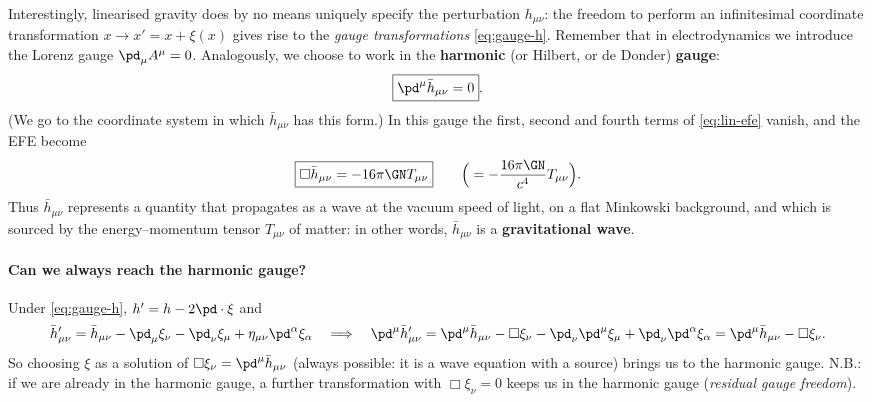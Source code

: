 Interestingly, linearised gravity does by no means uniquely specify the perturbation $h_{\mu\nu}$: the freedom to perform an infinitesimal coordinate transformation $x\to x'=x+\xi(x)$ gives rise to the \emph{gauge transformations} \eqref{eq:gauge-h}. Remember that in electrodynamics we introduce the Lorenz gauge $\pd_\mu A^\mu=0$. Analogously, we choose to work in the \textbf{harmonic} (or Hilbert, or de Donder) \textbf{gauge}:
\begin{equation}
  \boxed{\pd^\mu\bar h_{\mu\nu}=0}.
\end{equation}
(We go to the coordinate system in which $\bar h_{\mu\nu}$ has this form.) In this gauge the first, second and fourth terms of \eqref{eq:lin-efe} vanish, and the EFE become
\begin{equation}
  \boxed{\Box\bar h_{\mu\nu}=-16\pi\GN T_{\mu\nu}}\qquad\Big(=-\frac{16\pi\GN}{c^4}T_{\mu\nu}\Big).
\end{equation}
Thus $\bar h_{\mu\nu}$ represents a quantity that propagates as a wave at the vacuum speed of light, on a flat Minkowski background, and which is sourced by the energy--momentum tensor $T_{\mu\nu}$ of matter: in other words, $\bar h_{\mu\nu}$ is a \textbf{gravitational wave}.

\paragraph{Can we always reach the harmonic gauge?} Under \eqref{eq:gauge-h}, $h'=h-2\pd\cdot\xi$ and
\[
  \bar h'_{\mu\nu}=\bar h_{\mu\nu}-\pd_\mu\xi_\nu-\pd_\nu\xi_\mu+\eta_{\mu\nu}\pd^\alpha\xi_\alpha
  \quad\Longrightarrow\quad\pd^\mu\bar h'_{\mu\nu}=\pd^\mu\bar h_{\mu\nu}-\Box\xi_\nu-\pd_\nu\pd^\mu\xi_\mu+\pd_\nu\pd^\alpha\xi_\alpha=\pd^\mu\bar h_{\mu\nu}-\Box\xi_\nu .
\]
So choosing $\xi$ as a solution of $\Box\xi_\nu=\pd^\mu\bar h_{\mu\nu}$ (always possible: it is a wave equation with a source) brings us to the harmonic gauge. N.B.: if we are already in the harmonic gauge, a further transformation with $\Box\xi_\nu=0$ keeps us in the harmonic gauge (\emph{residual gauge freedom}).

